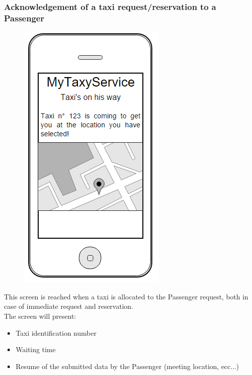 \subsubsection{Acknowledgement of a taxi request/reservation to a Passenger}
\begin{figure}[H]
\centering
\includegraphics[scale=0.6]{Images/taxi_coming}
\end{figure}
This screen is reached when a taxi is allocated to the Passenger request, both in case of immediate request and reservation.\\
The screen will present:
\begin{itemize}
\item Taxi identification number
\item Waiting time
\item Resume of the submitted data by the Passenger (meeting location, ecc...)
\end{itemize}

